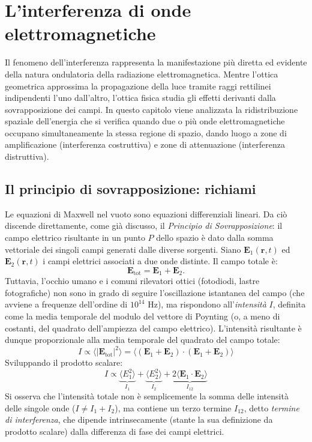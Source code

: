 \documentclass[a4paper,11pt]{report}
\begin{document}
\chapter{L'interferenza di onde elettromagnetiche}
\label{chap:interferenza}

Il fenomeno dell'interferenza rappresenta la manifestazione più diretta ed evidente della natura ondulatoria della radiazione elettromagnetica. Mentre l'ottica geometrica approssima la propagazione della luce tramite raggi rettilinei indipendenti l'uno dall'altro, l'ottica fisica studia gli effetti derivanti dalla sovrapposizione dei campi.
In questo capitolo viene analizzata la ridistribuzione spaziale dell'energia che si verifica quando due o più onde elettromagnetiche occupano simultaneamente la stessa regione di spazio, dando luogo a zone di amplificazione (interferenza costruttiva) e zone di attenuazione (interferenza distruttiva).

\section{Il principio di sovrapposizione: richiami}
Le equazioni di Maxwell nel vuoto sono equazioni differenziali lineari. Da ciò discende direttamente, come già discusso, il \textit{Principio di Sovrapposizione}: il campo elettrico risultante in un punto $P$ dello spazio è dato dalla somma vettoriale dei singoli campi generati dalle diverse sorgenti.
Siano $\bm{E}_1(\bm{r}, t)$ ed $\bm{E}_2(\bm{r}, t)$ i campi elettrici associati a due onde distinte. Il campo totale è:
\begin{equation}
    \bm{E}_{\text{tot}} = \bm{E}_1 + \bm{E}_2.
\end{equation}
Tuttavia, l'occhio umano e i comuni rilevatori ottici (fotodiodi, lastre fotografiche) non sono in grado di seguire l'oscillazione istantanea del campo (che avviene a frequenze dell'ordine di $10^{14}$ Hz), ma rispondono all'\textit{intensità} $I$, definita come la media temporale del modulo del vettore di Poynting (o, a meno di costanti, del quadrato dell'ampiezza del campo elettrico).
L'intensità risultante è dunque proporzionale alla media temporale del quadrato del campo totale:
\begin{equation}
    I \propto \langle |\bm{E}_{\text{tot}}|^2 \rangle = \langle (\bm{E}_1 + \bm{E}_2) \cdot (\bm{E}_1 + \bm{E}_2) \rangle
\end{equation}
Sviluppando il prodotto scalare:
\begin{equation}
    I \propto \underbrace{\langle E_1^2 \rangle}_{I_1} + \underbrace{\langle E_2^2 \rangle}_{I_2} + \underbrace{2 \langle \bm{E}_1 \cdot \bm{E}_2 \rangle}_{I_{12}}
\end{equation}
Si osserva che l'intensità totale non è semplicemente la somma delle intensità delle singole onde ($I \neq I_1 + I_2$), ma contiene un terzo termine $I_{12}$, detto \textit{termine di interferenza}, che dipende intrinsecamente (stante la sua definizione da prodotto scalare) dalla differenza di fase dei campi elettrici.
\end{document}
